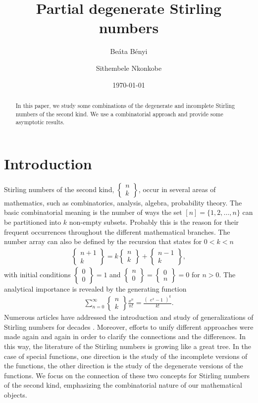 \documentclass[12pt, reqno]{amsart}
\title[]{Partial degenerate Stirling numbers}
\author{Be\'ata B\'enyi}
\author{Sithembele Nkonkobe}
\date{\today}
\newtheorem{proof 1}{proof 1}
\def\sts#1#2{\begin{Bmatrix}
#1 \\ #2 \end{Bmatrix}}
\begin{document}
\begin{abstract}
		In this paper, we study some combinations of the degenerate and incomplete Stirling numbers of the second kind. We use a combinatorial approach and provide some asymptotic results. 	\end{abstract}
        
        
        \maketitle

\section{Introduction}
 Stirling numbers of the second kind, $\sts{n}{k}$, occur in several areas of mathematics, such as combinatorics, analysis, algebra, probability theory. The basic combinatorial meaning is the number of ways the set $[n] = \{1,2,\ldots, n\}$  can be partitioned into $k$ non-empty subsets. Probably this is the reason for their frequent occurrences throughout the different mathematical branches. The number array can also be defined by the recursion that states for $0<k<n$
 \begin{align}\label{classic_recursion}
\sts{n+1}{k} = k\sts{n}{k} + \sts{n-1}{k}, 
 \end{align}
 with initial conditions $\sts{0}{0} = 1$ and $\sts{n}{0}=\sts{0}{n}=0$ for $n>0$.
The analytical importance is revealed by the generating function
\begin{align}\label{classical_genfun}
		\sum\limits_{n=0}^\infty \sts{n}{k}\frac{x^n}{n!}=\frac{\begin{pmatrix}e^x-1\end{pmatrix}^k}{k!}.
\end{align}
Numerous articles have addressed the introduction and study of generalizations of Stirling numbers for decades \cite{Barati19, broder1984r,hsu1998unified,mansour2011new,munagi2016combinatorial,simsek2007q}. Moreover, efforts to unify different approaches were made again and again in order to clarify the connections and the differences. In this way, the literature of the Stirling numbers is growing like a great tree. In the case of special functions, one direction is the study of the incomplete versions of the functions, the other direction is the study of the degenerate versions of the functions. We focus on the connection of these two concepts for Stirling numbers of the second kind, emphasizing the combinatorial nature of our mathematical objects.   
\end{document}
